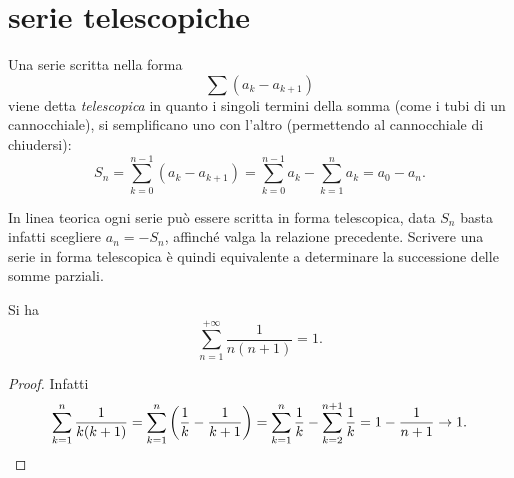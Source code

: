 \section{serie telescopiche}

Una serie scritta nella forma
\[
  \sum (a_{k} - a_{k+1})
\]
viene detta \emph{telescopica}
%
in quanto i singoli termini della somma (come i tubi di un cannocchiale),
si semplificano uno con l'altro (permettendo al cannocchiale di chiudersi):
\[
  S_n 
  = \sum_{k=0}^{n-1} (a_{k} - a_{k+1})
  = \sum_{k=0}^{n-1} a_k - \sum_{k=1}^{n} a_k
  = a_0 - a_n.
\]

In linea teorica ogni serie può essere scritta in forma telescopica,
data $S_n$ basta infatti scegliere $a_n=-S_n$, 
affinché valga la relazione precedente. 
Scrivere una serie in forma telescopica è quindi equivalente a 
determinare la successione delle somme parziali.

\begin{example}
\mymark{**}
Si ha
\[
  \sum_{n=1}^{+\infty} \frac{1}{n(n+1)} = 1.
\]
\end{example}
%
\begin{proof}
\mymark{**}
Infatti
\[
  \sum_{k=1}^n \frac{1}{k(k+1)}
  = \sum_{k=1}^n {\left( \frac{1}{k} - \frac{1}{k+1} \right)}
  = \sum_{k=1}^n \frac{1}{k} - \sum_{k=2}^{n+1} \frac{1}{k}
  = 1 - \frac{1}{n+1} \to 1.
\]
\end{proof}

